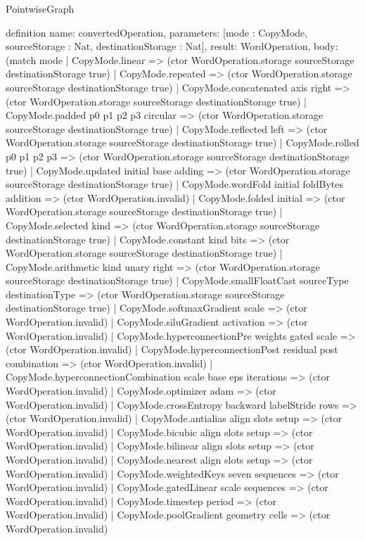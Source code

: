 \begin{lexlean}{PointwiseGraph}
\begin{semanticmodule}
definition{
  name: convertedOperation,
  parameters: [mode : CopyMode, sourceStorage : Nat, destinationStorage : Nat],
  result: WordOperation,
  body: (match mode
    | CopyMode.linear => (ctor WordOperation.storage sourceStorage destinationStorage true)
    | CopyMode.repeated => (ctor WordOperation.storage sourceStorage destinationStorage true)
    | CopyMode.concatenated axis right => (ctor WordOperation.storage sourceStorage destinationStorage true)
    | CopyMode.padded p0 p1 p2 p3 circular => (ctor WordOperation.storage sourceStorage destinationStorage true)
    | CopyMode.reflected left => (ctor WordOperation.storage sourceStorage destinationStorage true)
    | CopyMode.rolled p0 p1 p2 p3 => (ctor WordOperation.storage sourceStorage destinationStorage true)
    | CopyMode.updated initial base adding => (ctor WordOperation.storage sourceStorage destinationStorage true)
    | CopyMode.wordFold initial foldBytes addition => (ctor WordOperation.invalid)
    | CopyMode.folded initial => (ctor WordOperation.storage sourceStorage destinationStorage true)
    | CopyMode.selected kind => (ctor WordOperation.storage sourceStorage destinationStorage true)
    | CopyMode.constant kind bits => (ctor WordOperation.storage sourceStorage destinationStorage true)
    | CopyMode.arithmetic kind unary right => (ctor WordOperation.storage sourceStorage destinationStorage true)
    | CopyMode.smallFloatCast sourceType destinationType => (ctor WordOperation.storage sourceStorage destinationStorage true)
    | CopyMode.softmaxGradient scale => (ctor WordOperation.invalid)
    | CopyMode.siluGradient activation => (ctor WordOperation.invalid)
    | CopyMode.hyperconnectionPre weights gated scale => (ctor WordOperation.invalid)
    | CopyMode.hyperconnectionPost residual post combination => (ctor WordOperation.invalid)
    | CopyMode.hyperconnectionCombination scale base eps iterations => (ctor WordOperation.invalid)
    | CopyMode.optimizer adam => (ctor WordOperation.invalid)
    | CopyMode.crossEntropy backward labelStride rows => (ctor WordOperation.invalid)
    | CopyMode.antialias align slots setup => (ctor WordOperation.invalid)
    | CopyMode.bicubic align slots setup => (ctor WordOperation.invalid)
    | CopyMode.bilinear align slots setup => (ctor WordOperation.invalid)
    | CopyMode.nearest align slots setup => (ctor WordOperation.invalid)
    | CopyMode.weightedKeys seven sequences => (ctor WordOperation.invalid)
    | CopyMode.gatedLinear scale sequences => (ctor WordOperation.invalid)
    | CopyMode.timestep period => (ctor WordOperation.invalid)
    | CopyMode.poolGradient geometry cells => (ctor WordOperation.invalid)
}
\end{semanticmodule}
\end{lexlean}
